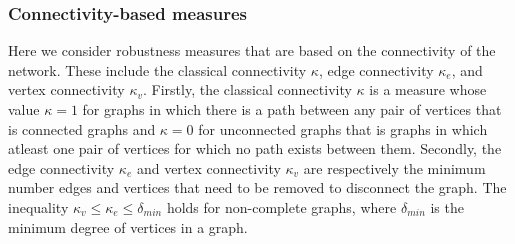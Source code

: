\documentclass[10pt,a4paper]{article}
\theoremstyle{plain}
\theoremstyle{definition}
\begin{document}
	\subsubsection{Connectivity-based measures}
	Here we consider robustness measures that are based on the connectivity of the network. These include the classical connectivity $\kappa$, edge connectivity $\kappa_e$, and vertex connectivity $\kappa_v$. Firstly, the classical connectivity $\kappa$ is a measure whose value $\kappa=1$ for graphs in which there is a path between any pair of vertices that is connected graphs and $\kappa=0$ for unconnected graphs that is graphs in which atleast one pair of vertices  for which no path exists between them. Secondly, the edge connectivity $\kappa_e$ and vertex connectivity $\kappa_v$ are respectively the minimum number edges and vertices that need to be removed to disconnect the graph. The inequality $\kappa_v \leq \kappa_e \leq \delta_{min}$ holds for non-complete graphs, where $\delta_{min}$ is the minimum degree of vertices in a graph.
\end{document}
